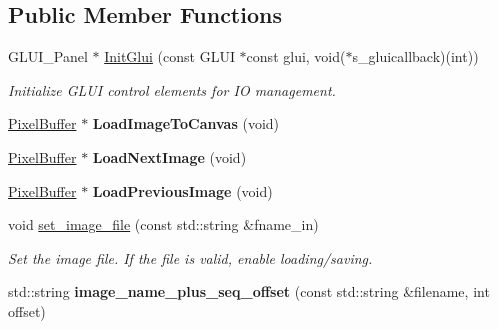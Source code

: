 \subsection*{Public Member Functions}
\begin{DoxyCompactItemize}
\item 
G\+L\+U\+I\+\_\+\+Panel $\ast$ \hyperlink{classimage__tools_1_1MIAIOManager_a02267caa7b3b9746d45e5f89138c1376}{Init\+Glui} (const G\+L\+UI $\ast$const glui, void($\ast$s\+\_\+gluicallback)(int))
\begin{DoxyCompactList}\small\item\em Initialize G\+L\+UI control elements for IO management. \end{DoxyCompactList}\item 
\hyperlink{classimage__tools_1_1PixelBuffer}{Pixel\+Buffer} $\ast$ {\bfseries Load\+Image\+To\+Canvas} (void)\hypertarget{classimage__tools_1_1MIAIOManager_a2090a835010ad899a9cdeda35925e229}{}\label{classimage__tools_1_1MIAIOManager_a2090a835010ad899a9cdeda35925e229}

\item 
\hyperlink{classimage__tools_1_1PixelBuffer}{Pixel\+Buffer} $\ast$ {\bfseries Load\+Next\+Image} (void)\hypertarget{classimage__tools_1_1MIAIOManager_ab7a8314058ab580ff3094595d3587e7a}{}\label{classimage__tools_1_1MIAIOManager_ab7a8314058ab580ff3094595d3587e7a}

\item 
\hyperlink{classimage__tools_1_1PixelBuffer}{Pixel\+Buffer} $\ast$ {\bfseries Load\+Previous\+Image} (void)\hypertarget{classimage__tools_1_1MIAIOManager_aacef5e50a03f949b480f46eef79f45cc}{}\label{classimage__tools_1_1MIAIOManager_aacef5e50a03f949b480f46eef79f45cc}

\item 
void \hyperlink{classimage__tools_1_1MIAIOManager_a209180ddcfe3bf43d8fd7c6635391ea4}{set\+\_\+image\+\_\+file} (const std\+::string \&fname\+\_\+in)
\begin{DoxyCompactList}\small\item\em Set the image file. If the file is valid, enable loading/saving. \end{DoxyCompactList}\item 
std\+::string {\bfseries image\+\_\+name\+\_\+plus\+\_\+seq\+\_\+offset} (const std\+::string \&filename, int offset)\hypertarget{classimage__tools_1_1MIAIOManager_ada4fae71b72e3a28ba40ffbc24ef8683}{}\label{classimage__tools_1_1MIAIOManager_ada4fae71b72e3a28ba40ffbc24ef8683}

\end{DoxyCompactItemize}
